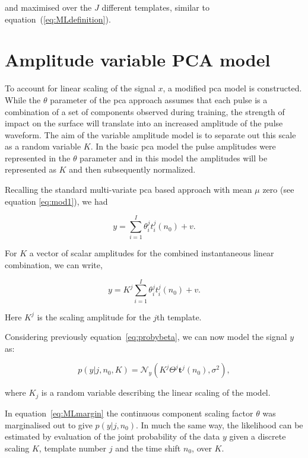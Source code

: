 and maximised over the $J$ different templates, similar to equation~(\ref{eq:MLdefinition}).

\section{Amplitude variable PCA model}\label{sec:KamplitudeModel}

To account for linear scaling of the signal $x$, a modified \gls{pca} model is constructed. While the $\theta$ parameter of the \gls{pca} approach assumes that each pulse is a combination of a set of components observed during training, the strength of impact on the surface will translate into an increased amplitude of the pulse waveform. The aim of the variable amplitude model is to separate out this scale as a random variable $K$. In the basic \gls{pca} model the pulse amplitudes were represented in the $\theta$ parameter and in this model the amplitudes will be represented as $K$ and then subsequently normalized. 

Recalling the standard multi-variate \gls{pca} based approach with mean $\mu$ zero (see equation \ref{eq:mod1}), we had

\begin{equation}\label{eq:K_PCAmodel}
y = \sum^I_{i=1} \theta^j_i t^j_i(n_0) + v.
\end{equation}

For $K$ a vector of scalar amplitudes for the combined instantaneous linear combination, we can write,

\begin{equation}\label{eq:Kmodel}
y = K^j \sum^I_{i=1} \theta^j_i t^j_i(n_0) + v.
\end{equation}

Here $K^j$ is the scaling amplitude for the $j$th template.

Considering previously equation~\ref{eq:probybeta}, we can now model the signal $y$ as:

\begin{equation}\label{eq:GP2}
    p(y|j,n_0,K) = \mathcal{N}_y(K^j \Theta^j \textbf{t}^j(n_0) , \sigma^2),
\end{equation}

where $K_j$ is a random variable describing the linear scaling of the model.

In equation~\ref{eq:MLmargin} the continuous component scaling factor $\theta$ was marginalised out to give $p(y|j,n_0)$. In much the same way, the likelihood can be estimated by evaluation of the joint probability of the data $y$ given a discrete scaling $K$, template number $j$ and the time shift $n_0$, over $K$.

